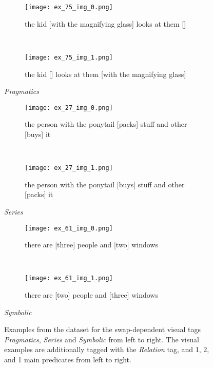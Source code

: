 \begin{figure}
\centering
    \begin{minipage}{.30\textwidth}
        \begin{subfigure}{\textwidth}
        \centering
        \texttt{[image: ex\_75\_img\_0.png]}
        \caption{the kid [with the magnifying glass] looks at them []}
        \end{subfigure}\\
        \begin{subfigure}{\textwidth}
        \centering
        \texttt{[image: ex\_75\_img\_1.png]}
        \caption{the kid [] looks at them [with the magnifying glass]}
        \end{subfigure}%
        \caption*{\textit{Pragmatics}}
    \end{minipage}
    \hfill
    \begin{minipage}{.30\textwidth}
        \begin{subfigure}{\textwidth}
        \centering
        \texttt{[image: ex\_27\_img\_0.png]}
        \caption{the person with the ponytail [packs] stuff and other [buys] it}
        \end{subfigure}\\
        \begin{subfigure}{\textwidth}
        \centering
        \texttt{[image: ex\_27\_img\_1.png]}
        \caption{the person with the ponytail [buys] stuff and other [packs] it}
        \end{subfigure}%
        \caption*{\textit{Series}}
    \end{minipage}
    \hfill
    \begin{minipage}{.30\textwidth}
        \begin{subfigure}{\textwidth}
        \centering
        \texttt{[image: ex\_61\_img\_0.png]}
        \caption{there are [three] people and [two] windows}
        \end{subfigure}\\
        \begin{subfigure}{\textwidth}
        \centering
        \texttt{[image: ex\_61\_img\_1.png]}
        \caption{there are [two] people and [three] windows}
        \end{subfigure}%
        \caption*{\textit{Symbolic}}
    \end{minipage}
    \caption[]{Examples from the dataset for the swap-dependent visual tags \textit{Pragmatics}, \textit{Series} and \textit{Symbolic} from left to right. The visual examples are additionally tagged with the \textit{Relation} tag, and 1, 2, and 1 main predicates from left to right.}
    \label{fig:dataset-examples-visual}
\end{figure}


